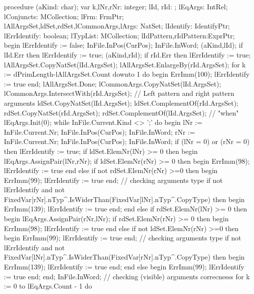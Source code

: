 procedure (aKind: char);
var
   k,lNr,rNr: integer;
   lId, rId: ;
   lEqArgs: IntRel;
   lConjuncts: MCollection;
   lFrm: FrmPtr;
   lAllArgsSet,ldSet,rdSet,lCommonArgs,lArgs: NatSet;
   lIdentify: IdentifyPtr;
   lErrIdentify: boolean;
   lTypList: MCollection;
   lIdPattern,rIdPattern:ExprPtr;
begin
   lErrIdentify := false;
   InFile.InPos(CurPos); InFile.InWord;
   (aKind,lId);
   if lId.Err then lErrIdentify := true;
   (aKind,rId);
   if rId.Err then lErrIdentify := true;
   lAllArgsSet.CopyNatSet(lId.ArgsSet);
   lAllArgsSet.EnlargeBy(rId.ArgsSet);
   for k := dPrimLength-lAllArgsSet.Count downto 1 do
   begin ErrImm(100); lErrIdentify := true end;
   lAllArgsSet.Done;
   lCommonArgs.CopyNatSet(lId.ArgsSet);
   lCommonArgs.IntersectWith(rId.ArgsSet);
   //  Left pattern and right pattern arguments
   ldSet.CopyNatSet(lId.ArgsSet); ldSet.ComplementOf(rId.ArgsSet);
   rdSet.CopyNatSet(rId.ArgsSet); rdSet.ComplementOf(lId.ArgsSet);
   // "when"
   lEqArgs.Init(0);
   while InFile.Current.Kind <> ';' do
   begin
      lNr := InFile.Current.Nr; InFile.InPos(CurPos); InFile.InWord;
      rNr := InFile.Current.Nr; InFile.InPos(CurPos); InFile.InWord;
      if (lNr = 0) or (rNr = 0) then
         lErrIdentify := true;
      if ldSet.ElemNr(lNr) >= 0 then
      begin
         lEqArgs.AssignPair(lNr,rNr);
         if ldSet.ElemNr(rNr) >= 0 then
         begin ErrImm(98); lErrIdentify := true end
         else if not rdSet.ElemNr(rNr) >=0 then
         begin ErrImm(99); lErrIdentify := true end;
         // checking arguments type
         if not lErrIdentify and
               not FixedVar[rNr].nTyp^.IsWiderThan(FixedVar[lNr].nTyp^.CopyType) then
         begin ErrImm(139); lErrIdentify := true end;
      end
      else if rdSet.ElemNr(lNr) >= 0 then
      begin
         lEqArgs.AssignPair(rNr,lNr);
         if rdSet.ElemNr(rNr) >= 0 then
         begin ErrImm(98); lErrIdentify := true end
         else if not ldSet.ElemNr(rNr) >=0 then
         begin ErrImm(99); lErrIdentify := true end;
         // checking arguments type
         if not lErrIdentify and
               not FixedVar[lNr].nTyp^.IsWiderThan(FixedVar[rNr].nTyp^.CopyType) then
         begin ErrImm(139); lErrIdentify := true end;
      end
      else
      begin ErrImm(99); lErrIdentify := true end;
   end;
   InFile.InWord;
   // checking (visible) arguments correcnesss
   for k  :=  0 to lEqArgs.Count - 1 do
